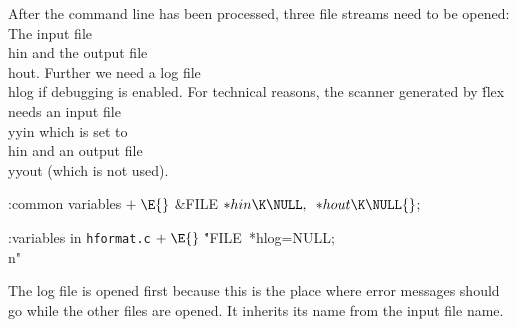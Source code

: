 
After the command line has been processed, three file streams need to be opened:
The input file \\{hin} and the output file \\{hout}.
Further we need a log file \\{hlog} if debugging is enabled.
For technical reasons, the scanner generated by \.{flex} needs
an input file \\{yyin} which is set to \\{hin}
and an output file \\{yyout} (which is not used).

\Y\B\4:common variables\X${}\mathrel+\E{}$\6
\&{FILE} ${}{*}\index{hin+\\{hin}}\\{hin}\K\NULL,{}$ ${}{*}\index{hout+\\{hout}}\\{hout}\K\NULL{}$;
\Y
\fi

\Y\B\4:variables in {\tt hformat.c}\X${}\mathrel+\E{}$\6
\.{"FILE\ *hlog=NULL;\\n"}
\Y
\fi


The log file is opened first because
this is the place where error messages
should go while the other files are opened.
It inherits its name from the input file name.


